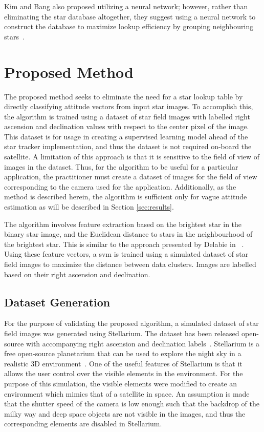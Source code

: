 \documentclass[10pt,twocolumn,letterpaper]{article}
\begin{document}
Kim and Bang also proposed utilizing a neural network; however, rather than eliminating the star database altogether, they suggest using a neural network to construct the database to maximize lookup efficiency by grouping neighbouring stars~\cite{neural2}.




\section{Proposed Method}
\label{sec:method}

The proposed method seeks to eliminate the need for a star lookup table by directly classifying attitude vectors from input star images. To accomplish this, the algorithm is trained using a dataset of star field images with labelled right ascension and declination values with respect to the center pixel of the image. This dataset is for usage in creating a supervised learning model ahead of the star tracker implementation, and thus the dataset is not required on-board the satellite. A limitation of this approach is that it is sensitive to the field of view of images in the dataset. Thus, for the algorithm to be useful for a particular application, the practitioner must create a dataset of images for the field of view corresponding to the camera used for the application. Additionally, as the method is described herein, the algorithm is sufficient only for vague attitude estimation as will be described in Section \ref{sec:results}.

The algorithm involves feature extraction based on the brightest star in the binary star image, and the Euclidean distance to stars in the neighbourhood of the brightest star. This is similar to the approach presented by Delabie \etal in ~\cite{optimal}. Using these feature vectors, a \acrfull{svm} is trained using a simulated dataset of star field images to maximize the distance between data clusters. Images are labelled based on their right ascension and declination.


\subsection{Dataset Generation}

For the purpose of validating the proposed algorithm, a simulated dataset of star field images was generated using Stellarium. The dataset has been released open-source with accompanying right ascension and declination labels~\cite{kaggle}. Stellarium is a free open-source planetarium that can be used to explore the night sky in a realistic 3D environment~\cite{stellarium}. One of the useful features of Stellarium is that it allows the user control over the visible elements in the environment. For the purpose of this simulation, the visible elements were modified to create an environment which mimics that of a satellite in space. An assumption is made that the shutter speed of the camera is low enough such that the backdrop of the milky way and deep space objects are not visible in the images, and thus the corresponding elements are disabled in Stellarium.
\end{document}
